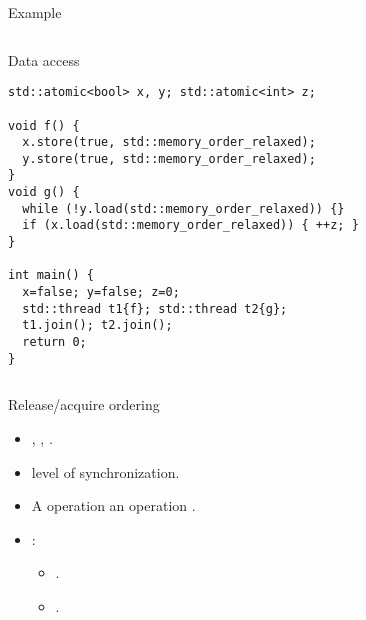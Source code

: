 \begin{frame}[fragile]{Example}
\begin{columns}

\begin{column}{.6\textwidth}
\begin{block}{Data access}
\begin{lstlisting}
std::atomic<bool> x, y; std::atomic<int> z;

void f() {
  x.store(true, std::memory_order_relaxed);
  y.store(true, std::memory_order_relaxed);
}
void g() {
  while (!y.load(std::memory_order_relaxed)) {}
  if (x.load(std::memory_order_relaxed)) { ++z; }
}

int main() {
  x=false; y=false; z=0;
  std::thread t1{f}; std::thread t2{g};
  t1.join(); t2.join();
  return 0;
}

\end{lstlisting}
\end{block}
\end{column}

\begin{column}{.4\textwidth}

\end{column}

\end{columns}
\end{frame}


\begin{frame}[t]{Release/acquire ordering}
\begin{itemize}
  \item {}, , .
  
  \item {} level of synchronization.
  
  \item A  operation  
         an  operation .
  
  \item {}:
    \begin{itemize}
      \item {}.
      \item {}.
    \end{itemize}
\end{itemize}
\end{frame}


